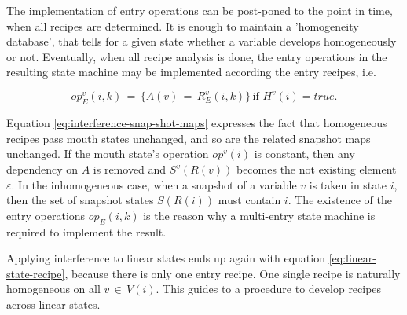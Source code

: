 \documentclass[12pt,a4paper]{scrartcl}
\begin{document}
The implementation of entry operations can be post-poned to the point in time,
when all recipes are determined. It is enough to maintain a 'homogeneity
database', that tells for a given state whether a variable develops
homogeneously or not. Eventually, when all recipe analysis is done, the entry
operations in the resulting state machine may be implemented according the
entry recipes, i.e.

\begin{equation} \label{eq:entry-operation-implementation}
    op_E^v(i,k) \,=\, \{ A(v) \,=\, R^v_E(i,k) \} \,\mbox{if $H^v(i) = true$}.
\end{equation}

Equation \eqref{eq:interference-snap-shot-maps} expresses the fact that
homogeneous recipes pass mouth states unchanged, and so are the related
snapshot maps unchanged. If the mouth state's operation $op^v(i)$ is 
constant, then any dependency on $A$ is removed and $S^v(R(v))$ becomes
the not existing element $\varepsilon$. In the inhomogeneous case, when a snapshot of a
variable $v$ is taken in state $i$, then the set of snapshot states $S(R(i))$
must contain $i$. The existence of the entry operations $op_E(i,k)$ is the
reason why a multi-entry state machine is required to implement the result. 

Applying interference to linear states ends up again with equation
\eqref{eq:linear-state-recipe}, because there is only one entry recipe.  One
single recipe is naturally homogeneous on all $v\,\in\,V(i)$. This guides to a
procedure to develop recipes across linear states.
\end{document}
